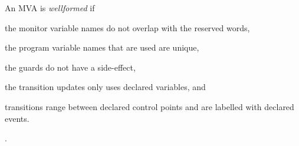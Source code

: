 An MVA is \emph{wellformed} if
\begin{inparaenum}
\item the monitor variable names do not overlap with the reserved
words,
\item the program variable names that are used are unique,
\item the guards do not have a side-effect,
\item the transition updates only uses declared variables, and
\item transitions range between declared control points and are
labelled with declared events.
\end{inparaenum}.


